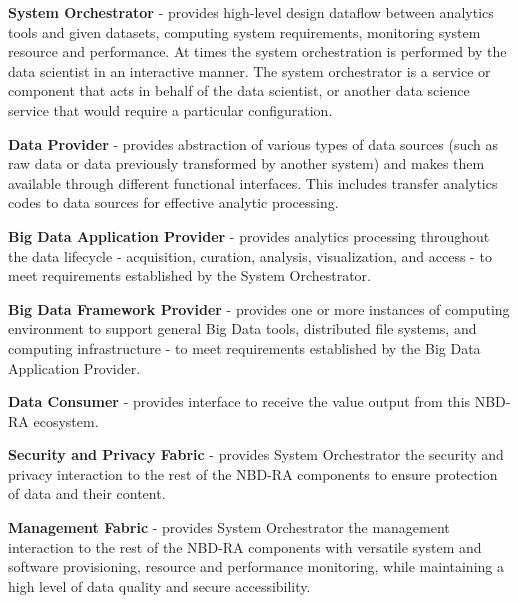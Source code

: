 \begin{description}

\item {\bf System Orchestrator} - provides high-level design dataflow
  between analytics tools and given datasets, computing system
  requirements, monitoring system resource and performance. At times
  the system orchestration is performed by the data scientist in an
  interactive manner. The system orchestrator is a service or
  component that acts in behalf of the data scientist, or another data
  science service that would require a particular configuration.

\item {\bf Data Provider} - provides abstraction of various types of
  data sources (such as raw data or data previously transformed by
  another system) and makes them available through different
  functional interfaces. This includes transfer analytics codes to
  data sources for effective analytic processing.


\item {\bf Big Data Application Provider} - provides analytics
  processing throughout the data lifecycle - acquisition, curation,
  analysis, visualization, and access - to meet requirements
  established by the System Orchestrator.


\item {\bf Big Data Framework Provider} - provides one or more
  instances of computing environment to support general Big Data
  tools, distributed file systems, and computing infrastructure - to
  meet requirements established by the Big Data Application Provider.


\item {\bf Data Consumer} - provides interface to receive the value
  output from this NBD-RA ecosystem.


\item {\bf Security and Privacy Fabric} - provides System Orchestrator
  the security and privacy interaction to the rest of the NBD-RA
  components to ensure protection of data and their content.


\item {\bf Management Fabric} - provides System Orchestrator the
  management interaction to the rest of the NBD-RA components with
  versatile system and software provisioning, resource and performance
  monitoring, while maintaining a high level of data quality and
  secure accessibility.

\end{description}




